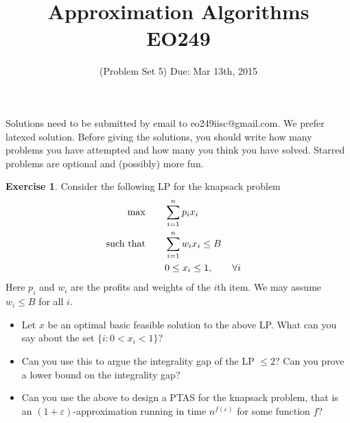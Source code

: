 \documentclass[11pt]{article}
\theoremstyle{definition}
\newtheorem{exercise}{Exercise}
\def\eps{\varepsilon}
\begin{document}
\title{{\bf Approximation Algorithms} \\ 
{\normalsize EO249}}
\date{(Problem Set 5) Due: Mar 13th, 2015}
\maketitle
{\small 
Solutions need to be submitted by email to eo249iisc@gmail.com. We prefer latexed solution. 
Before giving the solutions, you should write how many problems you have attempted and how many you think you have solved.
Starred problems are optional and (possibly) more fun.
}
\vspace{1ex}
\def\poly{\mathrm{poly}}
\begin{exercise}
Consider the following LP for the knapsack problem
\begin{align}
\max & \qquad \sum_{i=1}^n p_ix_i & \notag \\
\textrm{such that} &\qquad  \sum_{i=1}^n w_ix_i \leq B\notag \\
& \qquad 0 \leq x_i \leq 1, \qquad \forall i \notag
\end{align}
Here $p_i$ and $w_i$ are the profits and weights of the $i$th item. We may assume $w_i \leq B$ for all $i$.
\begin{itemize}
\item Let $x$ be an optimal basic feasible solution to the above LP. What can you say about the set $\{i: 0 < x_i < 1\}$?
\item Can you use this to argue the integrality gap of the LP $\leq 2$? Can you prove a lower bound on the integrality gap?
\item  Can you use the above to design a PTAS for the knapsack problem, that is an $(1+\eps)$-approximation running in time $n^{f(\eps)}$ for some function $f$?
\end{itemize}
\end{exercise}
\vspace{1ex}
\end{document}
